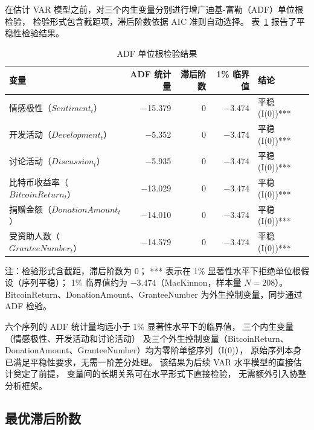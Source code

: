 在估计 VAR 模型之前，对三个内生变量分别进行增广迪基-富勒（ADF）单位根检验，
检验形式包含截距项，滞后阶数依据 AIC 准则自动选择。
表~\ref{tab:adf-test} 报告了平稳性检验结果。

\begin{table}[htbp]
    \centering
    \small
    \caption{ADF 单位根检验结果}
    \label{tab:adf-test}
    \begin{tabularx}{\textwidth}{Xrrrp{3cm}}
        \toprule
        变量 & ADF 统计量 & 滞后阶数 & 1\% 临界值 & 结论 \\
        \midrule
        情感极性（$Sentiment_t$） & $-$15.379 & 0 & $-$3.474 & 平稳 (I(0))*** \\
        开发活动（$Development_t$）      & $-$5.352  & 0 & $-$3.474 & 平稳 (I(0))*** \\
        讨论活动（$Discussion_t$）   & $-$5.935  & 0 & $-$3.474 & 平稳 (I(0))*** \\
        比特币收益率（$BitcoinReturn_t$）    & $-$13.029 & 0 & $-$3.474 & 平稳 (I(0))*** \\
        捐赠金额（$DonationAmount_t$）  & $-$14.010 & 0 & $-$3.474 & 平稳 (I(0))*** \\
        受资助人数（$GranteeNumber_t$）     & $-$14.579 & 0 & $-$3.474 & 平稳 (I(0))*** \\
        \bottomrule
    \end{tabularx}
    \begin{minipage}{\textwidth}
        \vspace{0.3em}
        \footnotesize 注：检验形式含截距，滞后阶数为 0；
        *** 表示在 1\% 显著性水平下拒绝单位根假设（序列平稳）；
        1\% 临界值约为 $-3.474$（MacKinnon，样本量 $N = 208$）。
        BitcoinReturn、DonationAmount、GranteeNumber 为外生控制变量，同步通过 ADF 检验。
    \end{minipage}
\end{table}

六个序列的 ADF 统计量均远小于 1\% 显著性水平下的临界值，
三个内生变量（情感极性、开发活动和讨论活动）
及三个外生控制变量（BitcoinReturn、DonationAmount、GranteeNumber）均为零阶单整序列（I(0)），
原始序列本身已满足平稳性要求，无需一阶差分处理。
该结果为后续 VAR 水平模型的直接估计奠定了前提，
变量间的长期关系可在水平形式下直接检验，
无需额外引入协整分析框架。

\subsection{最优滞后阶数}

